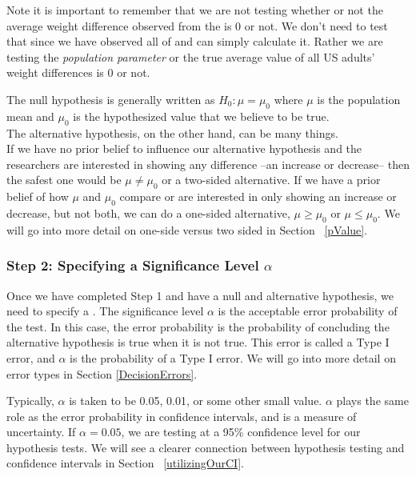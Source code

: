 Note it is important to remember that we are not testing whether or not the average weight difference observed from the  is 0 or not. We don't need to test that since we have observed all of  and can simply calculate it. Rather we are testing the \emph{population parameter} or the true average value of all US adults' weight differences is 0 or not. 

\begin{tipBox}{
The null hypothesis is generally written as $H_0: \mu=\mu_0$ where $\mu$ is the population mean and $\mu_0$ is the hypothesized value that we believe to be true.\\ The alternative hypothesis, on the other hand, can be many things.\\ If we have no prior belief to influence our alternative hypothesis and the researchers are interested in showing any difference --an increase or decrease-- then the safest one would be $\mu\neq \mu_0$ or a two-sided alternative. If we have a prior belief of how $\mu$ and $\mu_0$ compare or are interested in only showing an increase or decrease, but not both, we can do a one-sided alternative, $\mu\geq \mu_0$ or $\mu \leq \mu_0$. We will go into more detail on one-side versus two sided in Section ~\ref{pValue}.}
\end{tipBox}

\subsubsection{Step 2: Specifying a Significance Level $\alpha$}
Once we have completed Step 1 and have a null and alternative hypothesis, we need to specify a . The significance level $\alpha$ is the acceptable error probability of the test.
In this case, the error probability is the probability of concluding the alternative hypothesis is true when it is not
true. This error is called a Type I error, and $\alpha$ is the probability of a Type I error. We will go into more detail on error types in Section \ref{DecisionErrors}. 

Typically, $\alpha$ is taken to be 0.05, 0.01, or some other small value. $\alpha$ plays the same role as the error probability in confidence intervals, and is a measure of uncertainty. If $\alpha=0.05$, we are testing at a 95\% confidence level for our hypothesis tests. We will see a clearer connection between hypothesis testing and confidence intervals in Section ~\ref{utilizingOurCI}. 


